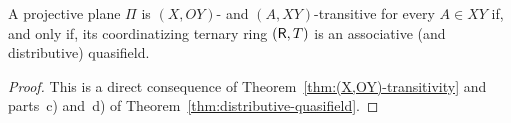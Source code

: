 \begin{thm}
    A projective plane\/ $\Pi$ is\/ $(X,OY)$- and\/ $(A,XY)$-transitive for every\/ $A\in XY$ if, and only if, its coordinatizing ternary ring\/ $(\mathsf R,T)$ is an associative (and distributive) quasifield.
\end{thm}

\begin{proof}
    This is a direct consequence of Theorem~\ref{thm:(X,OY)-transitivity} and parts~c) and~d) of Theorem~\ref{thm:distributive-quasifield}.
\end{proof}